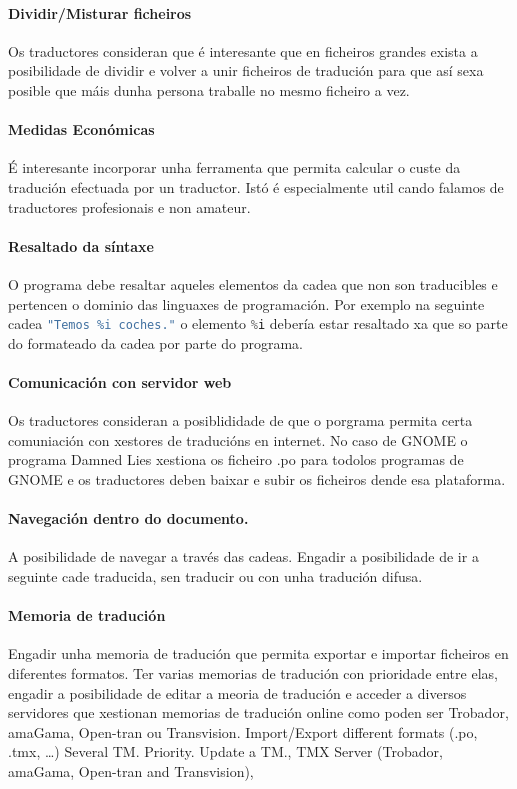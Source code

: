 	\paragraph{Dividir/Misturar ficheiros} Os traductores consideran que é interesante que en ficheiros grandes exista a posibilidade de dividir e volver a unir ficheiros de tradución para que así sexa posible que máis dunha persona traballe no mesmo ficheiro a vez.

	\paragraph{Medidas Económicas} É interesante incorporar unha ferramenta que permita calcular o custe da tradución efectuada por un traductor. Istó é especialmente util cando falamos de traductores profesionais e non amateur.

	\paragraph{Resaltado da síntaxe} O programa debe resaltar aqueles elementos da cadea que non son traducibles e pertencen o dominio das linguaxes de programación. Por exemplo na seguinte cadea \lstinline[language=C]{"Temos %i coches."} o elemento \lstinline[language=C]{%i} debería estar resaltado xa que so parte do formateado da cadea por parte do programa.

	\paragraph{Comunicación con servidor web} Os traductores consideran a posiblididade de que o porgrama permita certa comuniación con xestores de traducións en internet. No caso de GNOME o programa Damned Lies xestiona os ficheiro .po para todolos programas de GNOME e os traductores deben baixar e subir os ficheiros dende esa plataforma.

	\paragraph{Navegación dentro do documento.} A posibilidade de navegar a través das cadeas. Engadir a posibilidade de ir a seguinte cade traducida, sen traducir ou con unha tradución difusa.

	\paragraph{Memoria de tradución} Engadir unha memoria de tradución que permita exportar e importar ficheiros en diferentes formatos. Ter varias memorias  de tradución con prioridade entre elas, engadir a posibilidade de editar a meoria de tradución e acceder a diversos servidores que xestionan memorias de tradución online como poden ser Trobador, amaGama, Open-tran ou Transvision. Import/Export different formats (.po, .tmx, …) Several TM. Priority. Update a TM., TMX Server (Trobador, amaGama, Open-tran and Transvision),

